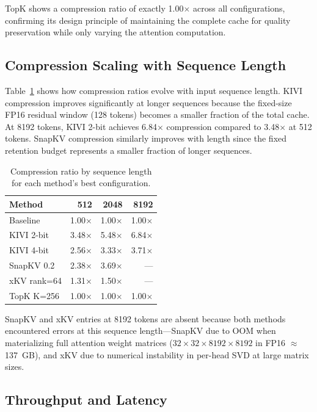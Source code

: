\documentclass[conference]{IEEEtran}
\begin{document}
TopK shows a compression ratio of exactly 1.00$\times$ across all configurations, confirming its design principle of maintaining the complete cache for quality preservation while only varying the attention computation.

\subsection{Compression Scaling with Sequence Length}

Table~\ref{tab:seq_scaling} shows how compression ratios evolve with input sequence length. KIVI compression improves significantly at longer sequences because the fixed-size FP16 residual window (128 tokens) becomes a smaller fraction of the total cache. At 8192 tokens, KIVI 2-bit achieves 6.84$\times$ compression compared to 3.48$\times$ at 512 tokens. SnapKV compression similarly improves with length since the fixed retention budget represents a smaller fraction of longer sequences.

\begin{table}[t]
\centering
\caption{Compression ratio by sequence length for each method's best configuration.}
\label{tab:seq_scaling}
\begin{tabular}{@{}lrrr@{}}
\toprule
\textbf{Method} & \textbf{512} & \textbf{2048} & \textbf{8192} \\
\midrule
Baseline & 1.00$\times$ & 1.00$\times$ & 1.00$\times$ \\
KIVI 2-bit & 3.48$\times$ & 5.48$\times$ & 6.84$\times$ \\
KIVI 4-bit & 2.56$\times$ & 3.33$\times$ & 3.71$\times$ \\
SnapKV 0.2 & 2.38$\times$ & 3.69$\times$ & --- \\
xKV rank=64 & 1.31$\times$ & 1.50$\times$ & --- \\
TopK K=256 & 1.00$\times$ & 1.00$\times$ & 1.00$\times$ \\
\bottomrule
\end{tabular}
\end{table}

SnapKV and xKV entries at 8192 tokens are absent because both methods encountered errors at this sequence length---SnapKV due to OOM when materializing full attention weight matrices ($32 \times 32 \times 8192 \times 8192$ in FP16 $\approx$ 137~GB), and xKV due to numerical instability in per-head SVD at large matrix sizes.

\subsection{Throughput and Latency}
\end{document}
